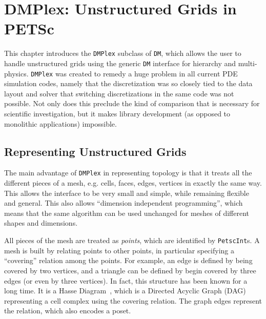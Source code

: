 \chapter{DMPlex: Unstructured Grids in PETSc}
\label{ch_unstructured}

This chapter introduces the \lstinline{DMPlex} subclass of \lstinline{DM}, which allows the user to handle unstructured grids using the generic
\lstinline{DM} interface for hierarchy and multi-physics. \lstinline{DMPlex} was created to remedy a huge problem in all current PDE
simulation codes, namely that the discretization was so closely tied to the data layout and solver that switching
discretizations in the same code was not possible. Not only does this preclude the kind of comparison that is necessary
for scientific investigation, but it makes library development (as opposed to monolithic applications) impossible.

\medskip \medskip

\section{Representing Unstructured Grids} 

The main advantage of \lstinline{DMPlex} in representing topology is that it treats all the different pieces of a mesh,
e.g. cells, faces, edges, vertices in exactly the same way. This allows the interface to be very small and simple, while
remaining flexible and general. This also allows ``dimension independent programming'', which means that the same
algorithm can be used unchanged for meshes of different shapes and dimensions.

All pieces of the mesh are treated as \textit{points}, which are identified by \lstinline{PetscInt}s. A mesh is built by relating
points to other points, in particular specifying a ``covering'' relation among the points. For example, an edge is
defined by being covered by two vertices, and a triangle can be defined by begin covered by three edges (or even by
three vertices). In fact, this structure has been known for a long time. It is a Hasse Diagram~\cite{HasseDiagram},
which is a Directed Acyclic Graph (DAG) representing a cell complex using the covering relation. The graph edges
represent the relation, which also encodes a poset.


